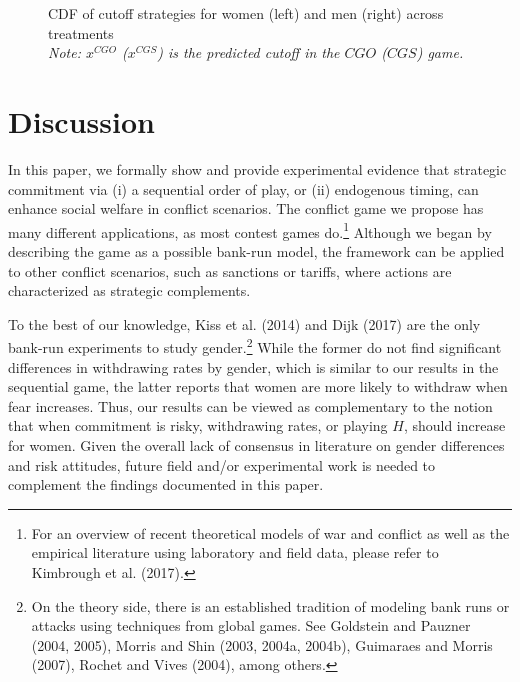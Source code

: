 \documentclass[11pt, letterpaper]{article}
\theoremstyle{plain}
\begin{document}
\begin{center}
\begin{figure}[ht]
\begin{minipage}[t]{0.45\columnwidth}
\end{minipage} 
\caption{CDF of cutoff strategies for women (left) and men (right) across treatments\\\footnotesize{\textit{Note: $x^{CGO}$ ($x^{CGS}$) is the predicted cutoff in the $CGO$ ($CGS$) game.}}}
\label{fig:cdfall}\end{figure}
\par\end{center}

\newpage
\section{Discussion}
\label{sec:discuss}

In this paper, we formally show and provide experimental evidence that strategic commitment via (i) a sequential order of play, or (ii) endogenous timing, can enhance social welfare in conflict scenarios. The conflict game we propose has many different applications, as most contest games do.\footnote{For an overview of recent theoretical models of war and conflict as well as the empirical literature using laboratory and field data, please refer to Kimbrough et al. (2017).}  Although we began by describing the game as a possible bank-run model, the framework can be applied to other conflict scenarios, such as sanctions or tariffs, where actions are characterized as strategic complements. 

 To the best of our knowledge, Kiss et al. (2014) and Dijk (2017) are the only bank-run experiments to study gender.\footnote{On the theory side, there is an established tradition of modeling bank runs or attacks using techniques from global games. See Goldstein and Pauzner (2004, 2005), Morris and Shin (2003, 2004a, 2004b), Guimaraes and Morris (2007), Rochet and Vives (2004), among others.} While the former do not find significant differences in withdrawing rates by gender, which is similar to our results in the sequential game, the latter reports that women are more likely to withdraw when fear increases. Thus, our results can be viewed as complementary to the notion that when commitment is risky, withdrawing rates, or playing $H$, should increase for women. Given the overall lack of consensus in literature on gender differences and risk attitudes, future field and/or experimental work is needed to complement the findings documented in this paper.
\end{document}
